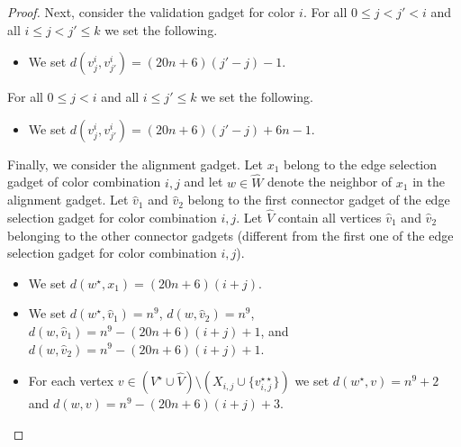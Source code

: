 \documentclass[a4paper,UKenglish,cleveref, autoref, thm-restate]{lipics-v2021}
\begin{document}
\begin{proof}
Next, consider the validation gadget for color $i$. 
%
For all $0\le j<j'<i$ and all $i\le j<j'\le k$ we set the following.
\begin{itemize}
    \item We set $d(v^i_j,v^i_{j'})=(20n+6)(j'-j)-1$.
\end{itemize}
For all $0\le j<i$ and all $i\le j'\le k$ we set the following.
\begin{itemize}
    \item We set $d(v^i_j,v^i_{j'})=(20n+6)(j'-j)+6n-1$.
\end{itemize}

Finally, we consider the alignment gadget. Let $x_1$ belong to the edge selection gadget of color combination $i,j$ and let $w\in \hat{W}$ denote the neighbor of $x_1$ in the alignment gadget. Let $\hat{v}_1$ and $\hat{v}_2$ belong to the first connector gadget of the edge selection gadget for color combination $i,j$. Let $\hat{V}$ contain all vertices $\hat{v}_1$ and $\hat{v}_2$ belonging to the other connector gadgets (different from the first one of the edge selection gadget for color combination $i,j$). 
\begin{itemize}
    \item We set $d(w^\star,x_1)=(20n+6)(i+j)$.
    \item We set $d(w^\star,\hat{v}_1)=n^9$, $d(w,\hat{v}_2)=n^9$, $d(w,\hat{v}_1)=n^9-(20n+6)(i+j)+1$, and $d(w,\hat{v}_2)=n^9-(20n+6)(i+j)+1$.
    \item For each vertex $v\in (V^\star\cup \hat{V})\setminus (X_{i,j}\cup \{v_{i,j}^{\star\star}\})$ we set $d(w^\star,v)=n^9+2$ and $d(w,v)=n^9-(20n+6)(i+j)+3$.
\end{itemize}


\end{proof}
\end{document}
